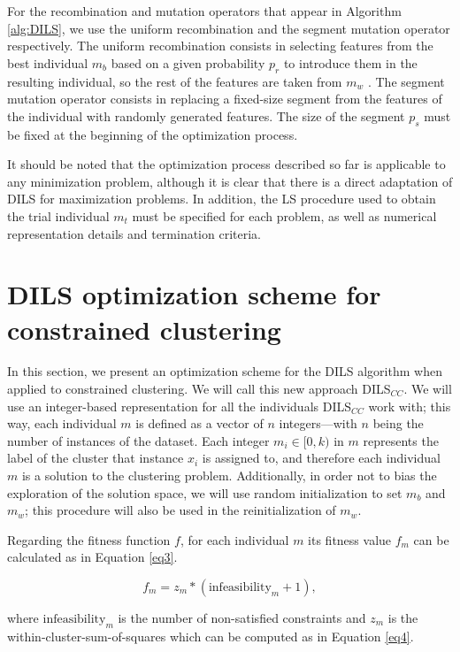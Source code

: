 \documentclass[review]{elsarticle}
\begin{document}
For the recombination and mutation operators that appear in Algorithm \ref{alg:DILS}, we use the uniform recombination and the segment mutation operator respectively. The uniform recombination consists in selecting features from the best individual $m_b$ based on a given probability $p_r$ to introduce them in the resulting individual, so the rest of the features are taken from $m_w$ \cite{spears1995virtues}. The segment mutation operator consists in replacing a fixed-size segment from the features of the individual with randomly generated features. The size of the segment $p_s$ must be fixed at the beginning of the optimization process.

It should be noted that the optimization process described so far is applicable to any minimization problem, although it is clear that there is a direct adaptation of DILS for maximization problems. In addition, the LS procedure used to obtain the trial individual $m_t$ must be specified for each problem, as well as numerical representation details and termination criteria.

\section{DILS optimization scheme for constrained clustering} \label{sec:DILS_CC}

In this section, we present an optimization scheme for the DILS algorithm when applied to constrained clustering. We will call this new approach DILS$_{CC}$. We will use an integer-based representation for all the individuals DILS$_{CC}$ work with; this way, each individual $m$ is defined as a vector of $n$ integers---with $n$ being the number of instances of the dataset. Each integer $m_i \in [0,k)$ in $m$ represents the label of the cluster that instance $x_i$ is assigned to, and therefore each individual $m$ is a solution to the clustering problem. Additionally, in order not to bias the exploration of the solution space, we will use random initialization to set $m_b$ and $m_w$; this procedure will also be used in the reinitialization of $m_w$.

Regarding the fitness function $f$, for each individual $m$ its fitness value $f_m$ can be calculated as in Equation \ref{eq3}.

\begin{equation}
f_m = z_m * (\text{infeasibility}_m + 1),
\label{eq3}
\end{equation}

\noindent where $\text{infeasibility}_m$ is the number of non-satisfied constraints and $z_m$ is the within-cluster-sum-of-squares which can be computed as in Equation \eqref{eq4}.
\end{document}
